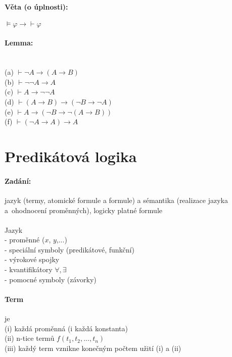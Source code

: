 \paragraph*{Věta (o úplnosti):}
$\models \varphi \rightarrow \vdash \varphi $

\paragraph*{Lemma:} ~\\
(a) $\vdash \neg A \rightarrow (A \rightarrow B)$\\
(b) $\vdash \neg \neg A \rightarrow A$\\
(c) $\vdash A \rightarrow \neg \neg A$\\
(d) $\vdash (A\rightarrow B) \rightarrow (\neg B \rightarrow \neg A)$\\
(e) $\vdash A \rightarrow (\neg B \rightarrow \neg(A\rightarrow B)) $\\
(f) $\vdash (\neg A \rightarrow A) \rightarrow A $

\section{Predikátová logika}
% 
\paragraph*{Zadání:}
jazyk (termy, atomické formule a formule) a sémantika (realizace jazyka a~ohodnocení proměnných), logicky platné formule\\
~\\
Jazyk\\
- proměnné ($x$, $y$,...)\\
- speciální symboly (predikátové, funkční)\\
- výrokové spojky\\
- kvantifikátory $\forall , \exists$\\
- pomocné symboly (závorky)

\paragraph*{Term} je\\
(i) každá proměnná (i každá konstanta)\\
(ii) n-tice termů $f(t_1,t_2,...,t_n)$\\
(iii) každý term vznikne konečným počtem užití (i) a (ii)

